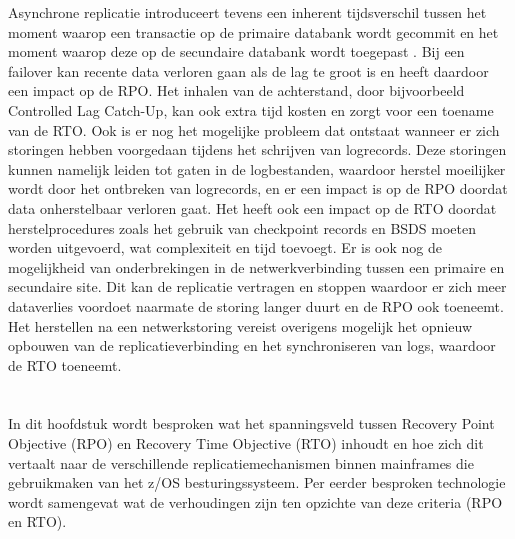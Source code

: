 Asynchrone replicatie introduceert tevens een inherent tijdsverschil tussen het moment waarop een transactie op de primaire databank wordt gecommit en het moment waarop deze op de secundaire databank wordt toegepast \autocite{white_2016_getting_started_ibm_z_resiliency}.
Bij een failover kan recente data verloren gaan als de lag te groot is en heeft daardoor een impact op de RPO.
Het inhalen van de achterstand, door bijvoorbeeld Controlled Lag Catch-Up, kan ook extra tijd kosten en zorgt voor een toename van de RTO.
Ook is er nog het mogelijke probleem dat ontstaat wanneer er zich storingen hebben voorgedaan tijdens het schrijven van logrecords. 
Deze storingen kunnen namelijk leiden tot gaten in de logbestanden, waardoor herstel moeilijker wordt door het ontbreken van logrecords, en er een impact is op de RPO doordat data onherstelbaar verloren gaat.
Het heeft ook een impact op de RTO doordat herstelprocedures zoals het gebruik van checkpoint records en BSDS moeten worden uitgevoerd, wat complexiteit en tijd toevoegt.
Er is ook nog de mogelijkheid van onderbrekingen in de netwerkverbinding tussen een primaire en secundaire site.
Dit kan de replicatie vertragen en stoppen waardoor er zich meer dataverlies voordoet naarmate de storing langer duurt en de RPO ook toeneemt.
Het herstellen na een netwerkstoring vereist overigens mogelijk het opnieuw opbouwen van de replicatieverbinding en het synchroniseren van logs, waardoor de RTO toeneemt.

\section{}%
\label{sec:rpo-rto-mainframe}
In dit hoofdstuk wordt besproken wat het spanningsveld tussen Recovery Point Objective (RPO) en Recovery Time Objective (RTO) inhoudt en hoe zich dit vertaalt naar de verschillende replicatiemechanismen binnen mainframes die gebruikmaken van het z/OS besturingssysteem.
Per eerder besproken technologie wordt samengevat wat de verhoudingen zijn ten opzichte van deze criteria (RPO en RTO)\@.

